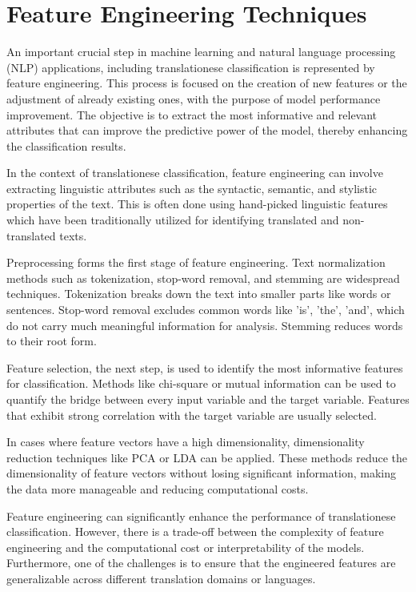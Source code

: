 \section{Feature Engineering Techniques}

An important crucial step in machine learning and natural language processing (NLP) applications, including translationese classification is represented by feature engineering. This process is focused on the creation of new features or the adjustment of already existing ones, with the purpose of model performance improvement. The objective is to extract the most informative and relevant attributes that can improve the predictive power of the model, thereby enhancing the classification results.

In the context of translationese classification, feature engineering can involve extracting linguistic attributes such as the syntactic, semantic, and stylistic properties of the text. This is often done using hand-picked linguistic features which have been traditionally utilized for identifying translated and non-translated texts.

Preprocessing forms the first stage of feature engineering. Text normalization methods such as tokenization, stop-word removal, and stemming are widespread techniques. Tokenization breaks down the text into smaller parts like words or sentences. Stop-word removal excludes common words like 'is', 'the', 'and', which do not carry much meaningful information for analysis. Stemming reduces words to their root form.

Feature selection, the next step, is used to identify the most informative features for classification. Methods like chi-square or mutual information can be used to quantify the bridge between every input variable and the target variable. Features that exhibit strong correlation with the target variable are usually selected.

In cases where feature vectors have a high dimensionality, dimensionality reduction techniques like PCA or LDA can be applied. These methods reduce the dimensionality of feature vectors without losing significant information, making the data more manageable and reducing computational costs.

Feature engineering can significantly enhance the performance of translationese classification. However, there is a trade-off between the complexity of feature engineering and the computational cost or interpretability of the models. Furthermore, one of the challenges is to ensure that the engineered features are generalizable across different translation domains or languages.

